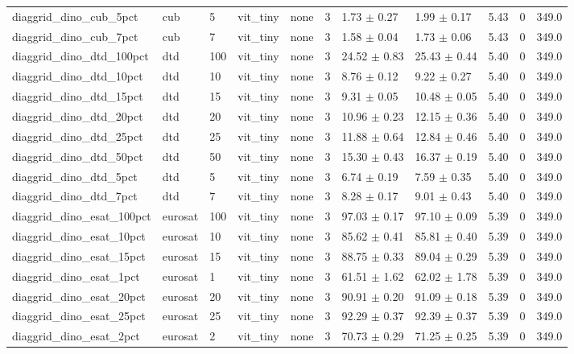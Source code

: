 \begin{tabular}{lllllllllll}
diaggrid_dino_cub_5pct & cub & 5 & vit_tiny & none & 3 & 1.73 $\pm$ 0.27 & 1.99 $\pm$ 0.17 & 5.43 & 0 & 349.0 \\
diaggrid_dino_cub_7pct & cub & 7 & vit_tiny & none & 3 & 1.58 $\pm$ 0.04 & 1.73 $\pm$ 0.06 & 5.43 & 0 & 349.0 \\
diaggrid_dino_dtd_100pct & dtd & 100 & vit_tiny & none & 3 & 24.52 $\pm$ 0.83 & 25.43 $\pm$ 0.44 & 5.40 & 0 & 349.0 \\
diaggrid_dino_dtd_10pct & dtd & 10 & vit_tiny & none & 3 & 8.76 $\pm$ 0.12 & 9.22 $\pm$ 0.27 & 5.40 & 0 & 349.0 \\
diaggrid_dino_dtd_15pct & dtd & 15 & vit_tiny & none & 3 & 9.31 $\pm$ 0.05 & 10.48 $\pm$ 0.05 & 5.40 & 0 & 349.0 \\
diaggrid_dino_dtd_20pct & dtd & 20 & vit_tiny & none & 3 & 10.96 $\pm$ 0.23 & 12.15 $\pm$ 0.36 & 5.40 & 0 & 349.0 \\
diaggrid_dino_dtd_25pct & dtd & 25 & vit_tiny & none & 3 & 11.88 $\pm$ 0.64 & 12.84 $\pm$ 0.46 & 5.40 & 0 & 349.0 \\
diaggrid_dino_dtd_50pct & dtd & 50 & vit_tiny & none & 3 & 15.30 $\pm$ 0.43 & 16.37 $\pm$ 0.19 & 5.40 & 0 & 349.0 \\
diaggrid_dino_dtd_5pct & dtd & 5 & vit_tiny & none & 3 & 6.74 $\pm$ 0.19 & 7.59 $\pm$ 0.35 & 5.40 & 0 & 349.0 \\
diaggrid_dino_dtd_7pct & dtd & 7 & vit_tiny & none & 3 & 8.28 $\pm$ 0.17 & 9.01 $\pm$ 0.43 & 5.40 & 0 & 349.0 \\
diaggrid_dino_esat_100pct & eurosat & 100 & vit_tiny & none & 3 & 97.03 $\pm$ 0.17 & 97.10 $\pm$ 0.09 & 5.39 & 0 & 349.0 \\
diaggrid_dino_esat_10pct & eurosat & 10 & vit_tiny & none & 3 & 85.62 $\pm$ 0.41 & 85.81 $\pm$ 0.40 & 5.39 & 0 & 349.0 \\
diaggrid_dino_esat_15pct & eurosat & 15 & vit_tiny & none & 3 & 88.75 $\pm$ 0.33 & 89.04 $\pm$ 0.29 & 5.39 & 0 & 349.0 \\
diaggrid_dino_esat_1pct & eurosat & 1 & vit_tiny & none & 3 & 61.51 $\pm$ 1.62 & 62.02 $\pm$ 1.78 & 5.39 & 0 & 349.0 \\
diaggrid_dino_esat_20pct & eurosat & 20 & vit_tiny & none & 3 & 90.91 $\pm$ 0.20 & 91.09 $\pm$ 0.18 & 5.39 & 0 & 349.0 \\
diaggrid_dino_esat_25pct & eurosat & 25 & vit_tiny & none & 3 & 92.29 $\pm$ 0.37 & 92.39 $\pm$ 0.37 & 5.39 & 0 & 349.0 \\
diaggrid_dino_esat_2pct & eurosat & 2 & vit_tiny & none & 3 & 70.73 $\pm$ 0.29 & 71.25 $\pm$ 0.25 & 5.39 & 0 & 349.0 \\

\end{tabular}
